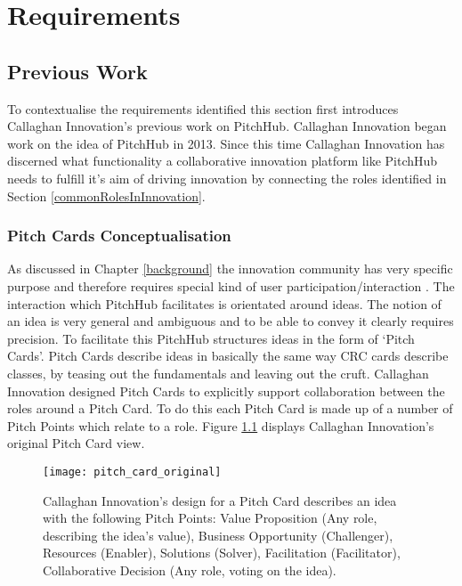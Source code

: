 \chapter{Requirements}\label{C:requirements}

\section{Previous Work}

To contextualise the requirements identified this section first introduces Callaghan Innovation's previous work on PitchHub. Callaghan Innovation began work on the idea of PitchHub in 2013. Since this time Callaghan Innovation has discerned what functionality a collaborative innovation platform like PitchHub needs to fulfill it's aim of driving innovation by connecting the roles identified in Section \ref{commonRolesInInnovation}.

\subsection{Pitch Cards Conceptualisation}
As discussed in Chapter \ref{background} the innovation community has very specific purpose and therefore requires special kind of user participation/interaction \cite{Jruby:online}. The interaction which PitchHub facilitates is orientated around ideas. The notion of an idea is very general and ambiguous and to be able to convey it clearly requires precision. To facilitate this PitchHub structures ideas in the form of `Pitch Cards'. Pitch Cards describe ideas in basically the same way CRC cards describe classes, by teasing out the fundamentals and leaving out the cruft. Callaghan Innovation designed Pitch Cards to explicitly support collaboration between the roles around a Pitch Card. To do this each Pitch Card is made up of a number of Pitch Points which relate to a role. Figure \ref{fig:pitch_card_original} displays Callaghan Innovation's original Pitch Card view.
\begin{figure}[ht]
    \centering
    \texttt{[image: pitch\_card\_original]}
    \caption{Callaghan Innovation's design for a Pitch Card describes an idea with the following Pitch Points: Value Proposition (Any role, describing the idea's value), Business Opportunity (Challenger), Resources (Enabler), Solutions (Solver), Facilitation (Facilitator), Collaborative Decision (Any role, voting on the idea).}
    \label{fig:pitch_card_original}
\end{figure}

